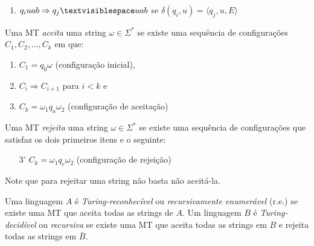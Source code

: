 \begin{example}
\begin{enumerate}
\begin{center}
\end{center}
  
\item $q_i uab \Rightarrow q_j \textvisiblespace uab$ se $\delta(q_i,u) = \langle q_j, u, E\rangle$

        \begin{center}
\end{center}
  \end{enumerate}
\end{example}



Uma MT {\em aceita} uma string $\omega \in \Sigma^*$ se existe uma sequência de configurações $C_1, C_2, \dots, C_k$ em que:
\begin{enumerate}
\item $C_1 = q_0 \omega$ (configuração inicial),
\item $C_i \Rightarrow C_{i+1}$ para $i < k$ e
\item $C_k = \omega_1 q_a \omega_2$ (configuração de aceitação)
\end{enumerate}

Uma MT {\em rejeita} uma string $\omega \in \Sigma^*$ se existe uma sequência de configurações que satisfaz os dois primeiros itens e o seguinte:
\begin{enumerate}
\item[3'] $C_k = \omega_1 q_r \omega_2$ (configuração de rejeição) 
\end{enumerate}

Note que para rejeitar uma string não basta não aceitá-la.

Uma linguagem $A$ é {\em Turing-reconhecível} ou {\em recursivamente enumerável} (r.e.) se existe uma MT que aceita todas as strings de $A$.
Um linguagem $B$ é {\em Turing-decidível} ou {\em recursiva} se existe uma MT que aceita todas as strings em $B$ e rejeita todas as strings em $\bar{B}$.  


